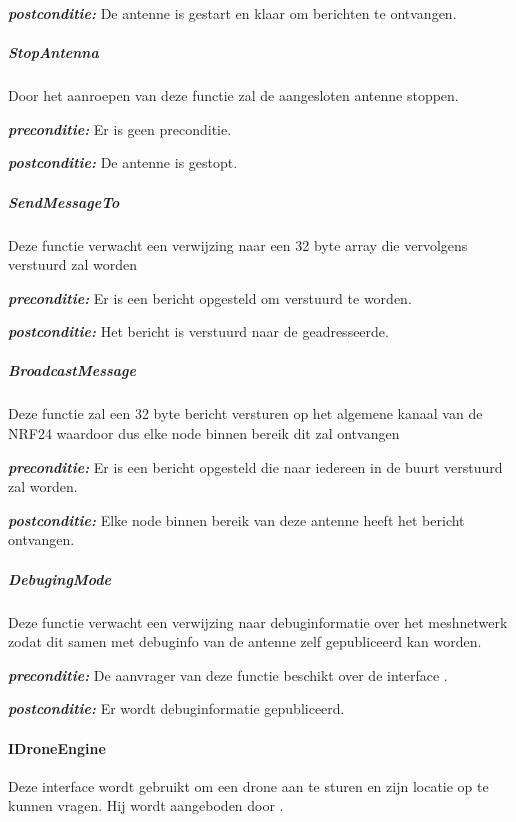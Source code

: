 \documentclass[a4paper, 11pt, oneside]{report}
\begin{document}
\textbf{\textit{postconditie:}} De antenne is gestart en klaar om berichten te ontvangen.

\subparagraph{StopAntenna}
\label{DetailedDesign:ros:extern:interfaces:IWirelessCommunication:StopAntenna}
Door het aanroepen van deze functie zal de aangesloten antenne stoppen.

\textbf{\textit{preconditie:}} Er is geen preconditie.

\textbf{\textit{postconditie:}} De antenne is gestopt.

\subparagraph{SendMessageTo}
\label{DetailedDesign:ros:extern:interfaces:IWirelessCommunication:SendMessageTo}
Deze functie verwacht een verwijzing naar een 32 byte array die vervolgens verstuurd zal worden

\textbf{\textit{preconditie:}}  Er is een bericht opgesteld om verstuurd te worden.

\textbf{\textit{postconditie:}} Het bericht is verstuurd naar de geadresseerde.

\subparagraph{BroadcastMessage}
\label{DetailedDesign:ros:extern:interfaces:IWirelessCommunication:BroadcastMessage}
Deze functie zal een 32 byte bericht versturen op het algemene kanaal van de NRF24 waardoor dus elke node binnen bereik dit zal ontvangen

\textbf{\textit{preconditie:}} Er is een bericht opgesteld die naar iedereen in de buurt verstuurd zal worden.

\textbf{\textit{postconditie:}} Elke node binnen bereik van deze antenne heeft het bericht ontvangen.


\subparagraph{DebugingMode}
\label{DetailedDesign:ros:extern:interfaces:IWirelessCommunication:DebuggingMode}
Deze functie verwacht een verwijzing naar debuginformatie over het meshnetwerk zodat dit samen met debuginfo van de antenne zelf gepubliceerd kan worden.

\textbf{\textit{preconditie:}} De aanvrager van deze functie beschikt over de interface .

\textbf{\textit{postconditie:}} Er wordt debuginformatie gepubliceerd.



\paragraph{IDroneEngine}
\label{DetailedDesign:ros:extern:interfaces:IDroneEngine}
Deze interface wordt gebruikt om een drone aan te sturen en zijn locatie op te kunnen vragen. Hij wordt aangeboden door .
\end{document}
